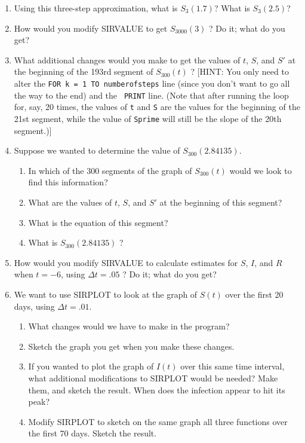 \begin{enumerate}
\item Using this three-step approximation, what is $S_{3}(1.7)$?  What
 is $S_{3}(2.5)$?  \hfill


\item How would you modify SIRVALUE to get $S_{3000}(3)$ ?  Do it; what
 do you get?


\item What additional changes would you make to get the values of $t$,
 $S$, and $S'$ at the beginning of the 193rd segment of $S_{300}(t)$ ?
  [HINT: You only need to alter the {\tt FOR k = 1 TO numberofsteps}
 line (since you don't want to go all the way to the end) and the {\tt
 PRINT} line.  (Note that after running the loop for, say, 20 times,
 the values of {\tt t} and {\tt S} are the values for the beginning of
 the 21st segment, while the value of {\tt Sprime} will still be the
 slope of the 20th segment.)]


\item Suppose we wanted to determine the value of $S_{300}(2.84135)$.

  \begin{enumerate}
  \item In which of the 300 segments of the graph of $S_{300}(t)$ would
 we look to find this information?

  \item What are the values of $t$, $S$, and $S'$ at the beginning of
 this segment?

  \item What is the equation of this segment?

  \item What is $S_{300}(2.84135)$ ?


\end{enumerate}
\item How would you modify SIRVALUE to calculate estimates for $S$,
 $I$, and $R$ when $t = -6$, using $\Delta t=.05$ ?  Do it; what do
 you get?



\item We want to use SIRPLOT to look at the graph of $S(t)$ over the
 first 20 days, using $\Delta t=.01$.

  \begin{enumerate}
  \item What changes would we have to make in the program?

  \item Sketch the graph you get when you make these changes.

  \item If you wanted to plot the graph of $I(t)$ over this same time
 interval, what additional modifications to SIRPLOT would be needed?
  Make them, and sketch the result.  When does the infection appear to
 hit its peak?

  \item Modify SIRPLOT to sketch on the same graph all three functions
 over the first 70 days.  Sketch the result.




\end{enumerate}
\end{enumerate}
